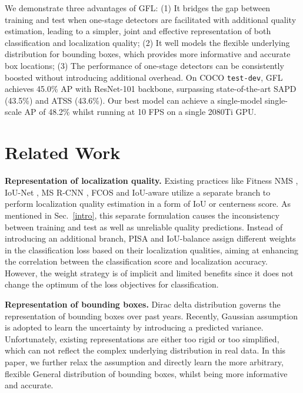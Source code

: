 \documentclass{article}
\begin{document}
We demonstrate three advantages of GFL: (1) It bridges the gap between training and test when one-stage detectors are facilitated with additional quality estimation, leading to a simpler, joint and effective representation of both classification and localization quality; (2) It well models the flexible underlying distribution for bounding boxes, which provides more informative and accurate box locations; (3) The performance of one-stage detectors can be consistently boosted without introducing additional overhead. On COCO {\tt test-dev}, GFL achieves 45.0\% AP with ResNet-101 backbone, surpassing state-of-the-art SAPD (43.5\%) and ATSS (43.6\%). Our best model can achieve a single-model single-scale AP of 48.2\% whilst running at 10 FPS on a single 2080Ti GPU. 



















\section{Related Work}
\vspace{-4pt}
\textbf{Representation of localization quality.} Existing practices like Fitness NMS \cite{tychsen2018improving}, IoU-Net \cite{jiang2018acquisition}, MS R-CNN \cite{huang2019mask}, FCOS \cite{tian2019fcos} and IoU-aware \cite{wu2020iou} utilize a separate branch to perform localization quality estimation in a form of IoU or centerness score. As mentioned in Sec.~\ref{intro}, this separate formulation causes the inconsistency between training and test as well as unreliable quality predictions.
Instead of introducing an additional branch, PISA \cite{cao2019prime} and IoU-balance \cite{wu2019iou} assign different weights in the classification loss based on their localization qualities, aiming at enhancing the correlation between the classification score and localization accuracy. However, the weight strategy is of implicit and limited benefits since it does not change the optimum of the loss objectives for classification.



\textbf{Representation of bounding boxes.} Dirac delta distribution \cite{girshick2015fast,ren2015faster,he2017mask,cai2018cascade,lin2017focal,tian2019fcos,kong2019foveabox,zhang2019bridging} governs the representation of bounding boxes over past years. Recently, Gaussian assumption \cite{he2019bounding,choi2019gaussian} is adopted to learn the uncertainty by introducing a predicted variance. Unfortunately, existing representations are either too rigid or too simplified, which can not reflect the complex underlying distribution in real data. In this paper, we further relax the assumption and directly learn the more arbitrary, flexible General distribution of bounding boxes, whilst being more informative and accurate. 
\end{document}
